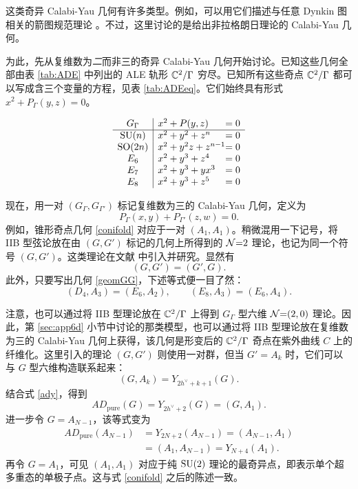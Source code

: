 这类奇异 Calabi-Yau 几何有许多类型。例如，可以用它们描述与任意 Dynkin 图相关的箭图规范理论 \cite{Katz:1997eq}。不过，这里讨论的是给出非拉格朗日理论的 Calabi-Yau 几何。

为此，先从复维数为\emph{二}而非三的奇异 Calabi-Yau 几何开始讨论。已知这些几何全部由表 \ref{tab:ADE} 中列出的 ALE 轨形 $\bC^2/\Gamma$ 穷尽。已知所有这些奇点 $\bC^2/\Gamma$ 都可以写成含三个变量的方程，见表 \ref{tab:ADEeq}。它们始终具有形式 $x^2+P_\Gamma(y,z)=0$。

\begin{table}
\[
\begin{array}{c|l@{}l}
G_\Gamma&x^2+P(y,z)&=0\\\hline
\SU(n)&x^2+y^2+z^n&=0\\
\SO(2n)&x^2+y^2z+z^{n-1}&=0\\
E_6&x^2+y^3+z^4&=0\\
E_7&x^2+y^3+yx^3&=0\\
E_8&x^2+y^3+z^5&=0
\end{array}
\]
\caption{单链李群 $G_\Gamma$ 及相应奇点 $\bC^2/\Gamma$ 的三变量方程表示。\label{tab:ADEeq}}
\end{table}

现在，用一对 $(G_\Gamma,G_{\Gamma'})$ 标记复维数为三的 Calabi-Yau 几何，定义为
\begin{equation}
P_\Gamma(x,y)+P_{\Gamma'}(z,w)=0.\label{geomGG}
\end{equation}
例如，锥形奇点几何 \eqref{conifold} 对应于一对 $(A_1,A_1)$。稍微混用一下记号，将 IIB 型弦论放在由 $(G,G')$ 标记的几何上所得到的 $\mathcal{N}{=}2$ 理论，也记为同一个符号 $(G,G')$。这类理论在文献 \cite{Cecotti:2010fi} 中引入并研究。显然有
\begin{equation}
(G,G')=(G',G).
\end{equation}
此外，只要写出几何 \eqref{geomGG}，下述等式便一目了然：
\begin{equation}
(D_4,A_3)=(E_6,A_2),\qquad(E_8,A_3)=(E_6,A_4).
\end{equation}

注意，也可以通过将 IIB 型理论放在 $\bC^2/\Gamma$ 上得到 $G_\Gamma$ 型六维 $\mathcal{N}{=}(2,0)$ 理论。因此，第 \ref{sec:app6d} 小节中讨论的那类模型，也可以通过将 IIB 型理论放在复维数为三的 Calabi-Yau 几何上获得，该几何是形变后的 $\bC^2/\Gamma$ 奇点在紫外曲线 $C$ 上的纤维化。这里引入的理论 $(G,G')$ 则使用一对群，但当 $G'=A_k$ 时，它们可以与 $G$ 型六维构造联系起来：
\begin{equation}
(G,A_k)=Y_{2h^\vee+k+1}(G).
\end{equation}
结合式 \eqref{ady}，得到
\begin{equation}
AD_\text{pure}(G)=Y_{2h^\vee+2}(G)=(G,A_1).\label{ADG}
\end{equation}
进一步令 $G=A_{N-1}$，该等式变为
\begin{equation}
\begin{aligned}
AD_\text{pure}(A_{N-1})&=Y_{2N+2}(A_{N-1})=(A_{N-1},A_1)\\
&=(A_1,A_{N-1})=Y_{N+4}(A_1).
\end{aligned}
\end{equation}
再令 $G=A_1$，可见 $(A_1,A_1)$ 对应于纯 $\mathop{\mathrm{SU}}(2)$ 理论的最奇异点，即表示单个超多重态的单极子点。这与式 \eqref{conifold} 之后的陈述一致。

